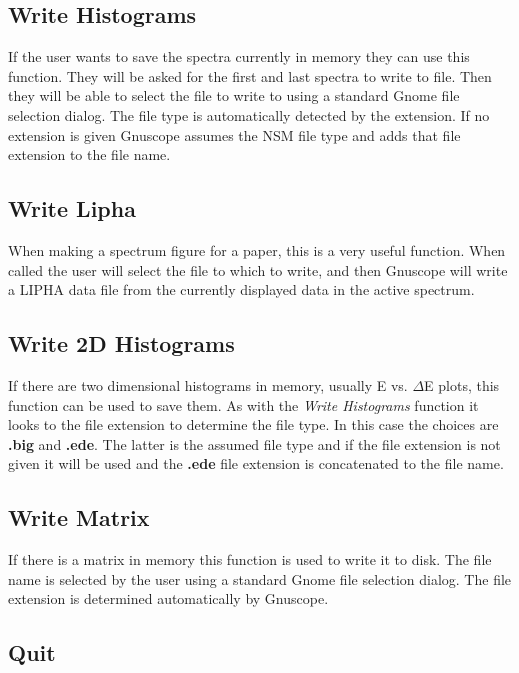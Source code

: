\subsection{Write Histograms}

If the user wants to save the spectra currently in memory they can use this function.  They will be asked for the first and last spectra to write to file.  Then they will be able to select the file to write to using a standard Gnome file selection dialog.  The file type is automatically detected by the extension.  If no extension is given Gnuscope assumes the NSM file type and adds that file extension to the file name.

\subsection{Write Lipha}

When making a spectrum figure for a paper, this is a very useful function.  When called the user will select the file to which to write, and then Gnuscope will write a LIPHA data file from the currently displayed data in the active spectrum.

\subsection{Write 2D Histograms}

If there are two dimensional histograms in memory, usually E vs. $\Delta$E plots, this function can be used to save them.  As with the {\it Write Histograms} function it looks to the file extension to determine the file type.  In this case the choices are {\bf .big} and {\bf .ede}.  The latter is the assumed file type and if the file extension is not given it will be used and the {\bf .ede} file extension is concatenated to the file name.

\subsection{Write Matrix}

If there is a matrix in memory this function is used to write it to disk.  The file name is selected by the user using a standard Gnome file selection dialog.  The file extension is determined automatically by Gnuscope.

\subsection{Quit}

